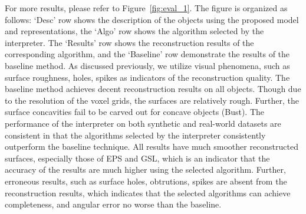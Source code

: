 For more results, please refer to Figure~\ref{fig:eval_1}. The figure is organized as follows: `Desc' row shows the description of the objects using the proposed model and representations, the `Algo' row shows the algorithm selected by the interpreter. The `Results' row shows the reconstruction results of the corresponding algorithm, and the `Baseline' row demonstrate the results of the baseline method. As discussed previously, we utilize visual phenomena, such as surface roughness, holes, spikes as indicators of the reconstruction quality. The baseline method achieves decent reconstruction results on all objects. Though due to the resolution of the voxel grids, the surfaces are relatively rough. Further, the surface concavities fail to be carved out for concave objects (Bust). The performance of the interpreter on both synthetic and real-world datasets are consistent in that the algorithms selected by the interpreter consistently outperform the baseline technique. All results have much smoother reconstructed surfaces, especially those of EPS and GSL, which is an indicator that the accuracy of the results are much higher using the selected algorithm. Further, erroneous results, such as surface holes, obtrutions, spikes are absent from the reconstruction results, which indicates that the selected algorithms can achieve completeness, and angular error no worse than the baseline.

